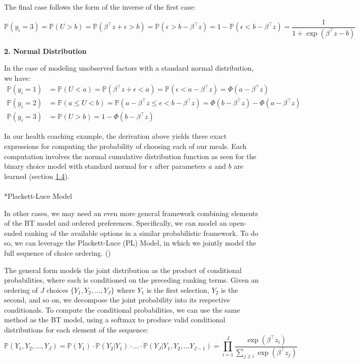 \documentclass[
  letterpaper,
  DIV=11,
  numbers=noendperiod,
  oneside]{scrreprt}
\makeatletter
\let\oldparagraph\paragraph
\renewcommand{\paragraph}{
    \@ifstar
      \xxxParagraphStar
      \xxxParagraphNoStar
  }
\newcommand{\xxxParagraphStar}[1]{\oldparagraph*{#1}\mbox{}}
\newcommand{\xxxParagraphNoStar}[1]{\oldparagraph{#1}\mbox{}}
\theoremstyle{remark}
\makeatother
\begin{document}
The final case follows the form of the inverse of the first case:

\[\mathbb{P}(y_i = 3) = \mathbb{P}(U > b) = \mathbb{P}(\beta^\top z + \epsilon > b ) = \mathbb{P}( \epsilon > b - \beta^\top z) = 1 - \mathbb{P}( \epsilon < b - \beta^\top z) = \frac{1}{1 + \exp(\beta^\top z - b)}\]

\textbf{2. Normal Distribution}

In the case of modeling unobserved factors with a standard normal
distribution, we have: \[\begin{split}
    \mathbb{P}(y_i = 1) & = \mathbb{P}(U < a) = \mathbb{P}(\beta^\top z + \epsilon < a ) = \mathbb{P}( \epsilon < a - \beta^\top z) = \Phi(a - \beta^\top z) \\
    \mathbb{P}(y_i = 2) & = \mathbb{P}(a \le U < b) 
    = \mathbb{P}(a - \beta^\top z \le \epsilon < b - \beta^\top z) = \Phi(b - \beta^\top z) - \Phi(a - \beta^\top z) \\
    \mathbb{P}(y_i = 3) & = \mathbb{P}(U > b) 
    = 1 - \Phi(b - \beta^\top z) 
\end{split}\]

In our health coaching example, the derivation above yields three exact
expressions for computing the probability of choosing each of our meals.
Each computation involves the normal cumulative distribution function as
seen for the binary choice model with standard normal for \(\epsilon\)
after parameters \(a\) and \(b\) are learned (section
\hyperref[sec:learning]{1.4}).

\paragraph*{Plackett-Luce Model}\label{plackett-luce-model}

In other cases, we may need an even more general framework combining
elements of the BT model and ordered preferences. Specifically, we can
model an open-ended ranking of the available options in a similar
probabilistic framework. To do so, we can leverage the Plackett-Luce
(PL) Model, in which we jointly model the full sequence of choice
ordering. ()

The general form models the joint distribution as the product of
conditional probabilities, where each is conditioned on the preceding
ranking terms. Given an ordering of \(J\) choices
\(\{Y_1, Y_2, \dots, Y_J\}\) where \(Y_1\) is the first selection,
\(Y_2\) is the second, and so on, we decompose the joint probability
into its respective conditionals. To compute the conditional
probabilities, we can use the same method as the BT model, using a
softmax to produce valid conditional distributions for each element of
the sequence:
\[\mathbb{P}(Y_1, Y_2, \dots, Y_J) = \mathbb{P}(Y_1) \cdot \mathbb{P}(Y_2 | Y_1) \cdot \dots \cdot \mathbb{P}(Y_J | Y_1, Y_2, \dots Y_{J - 1}) = \prod_{i = 1}^J \frac{\exp(\beta^\top z_i)}{\sum_{j \ge i} \exp(\beta^\top z_j)}\]
\end{document}
